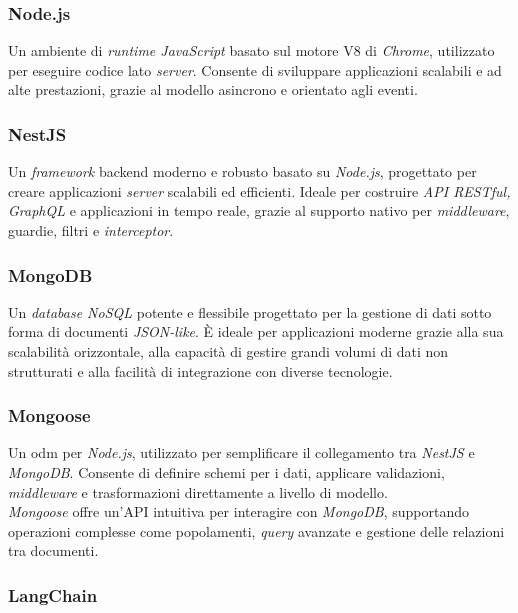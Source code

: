 \subsubsection{Node.js}

Un ambiente di \textit{runtime JavaScript} basato sul motore V8 di \textit{Chrome}, utilizzato per eseguire codice lato \textit{server}. 
Consente di sviluppare applicazioni scalabili e ad alte prestazioni, grazie al modello asincrono e orientato agli eventi.

\subsubsection{NestJS}

Un \textit{framework} \gls{backend} moderno e robusto basato su \textit{Node.js}, progettato per creare applicazioni \textit{server} scalabili ed efficienti.
Ideale per costruire \textit{API RESTful, GraphQL} e applicazioni in tempo reale, grazie al supporto nativo per \textit{middleware}, guardie, filtri e \textit{interceptor}.

\subsubsection{MongoDB}

Un \textit{database NoSQL} potente e flessibile progettato per la gestione di dati sotto forma di documenti \textit{JSON-like}. 
È ideale per applicazioni moderne grazie alla sua scalabilità orizzontale, alla capacità di gestire grandi volumi di dati non strutturati e alla facilità di integrazione con diverse tecnologie.

\subsubsection{Mongoose}

Un \gls{odm} per \textit{Node.js}, utilizzato per semplificare il collegamento tra \textit{NestJS} e \textit{MongoDB}. Consente di definire schemi per i dati, applicare validazioni, \textit{middleware} e trasformazioni direttamente a livello di modello. \\
\textit{Mongoose} offre un'API intuitiva per interagire con \textit{MongoDB}, supportando operazioni complesse come popolamenti, \textit{query} avanzate e gestione delle relazioni tra documenti. 

\subsubsection{LangChain}

